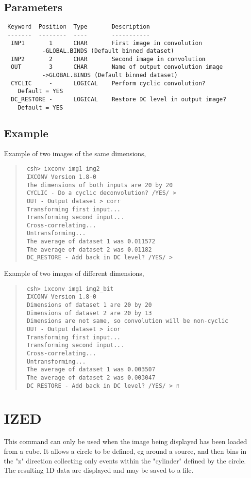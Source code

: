 \documentclass{book}
\renewcommand{\_}{{\tt\char'137}}     %
\begin{document}
\subsection{Parameters}
\begin{verbatim}
 Keyword  Position  Type       Description
 -------  --------  ----       -----------
  INP1       1      CHAR       First image in convolution
           -GLOBAL.BINDS (Default binned dataset)
  INP2       2      CHAR       Second image in convolution
  OUT        3      CHAR       Name of output convolution image
           ->GLOBAL.BINDS (Default binned dataset)
  CYCLIC     -      LOGICAL    Perform cyclic convolution?
    Default = YES
  DC_RESTORE -      LOGICAL    Restore DC level in output image?
    Default = YES

\end{verbatim}\subsection{Example}
Example of two images of the same dimensions,
\begin{quote}\begin{verbatim}
 csh> ixconv img1 img2
 IXCONV Version 1.8-0
 The dimensions of both inputs are 20 by 20
 CYCLIC - Do a cyclic deconvolution? /YES/ >
 OUT - Output dataset > corr
 Transforming first input...
 Transforming second input...
 Cross-correlating...
 Untransforming...
 The average of dataset 1 was 0.011572
 The average of dataset 2 was 0.01182
 DC_RESTORE - Add back in DC level? /YES/ >
 \end{verbatim}\end{quote}
Example of two images of different dimensions,
\begin{quote}\begin{verbatim}
 csh> ixconv img1 img2_bit
 IXCONV Version 1.8-0
 Dimensions of dataset 1 are 20 by 20
 Dimensions of dataset 2 are 20 by 13
 Dimensions are not same, so convolution will be non-cyclic
 OUT - Output dataset > icor
 Transforming first input...
 Transforming second input...
 Cross-correlating...
 Untransforming...
 The average of dataset 1 was 0.003507
 The average of dataset 2 was 0.003047
 DC_RESTORE - Add back in DC level? /YES/ > n
 \end{verbatim}\end{quote}
\section{IZED}
This command can only be used when the image being displayed
has been loaded from a cube. It allows a circle to be defined,
eg around a source, and then bins in the "z" direction collecting
only events within the "cylinder" defined by the circle. The
resulting 1D data are displayed and may be saved to a file.
\end{document}
